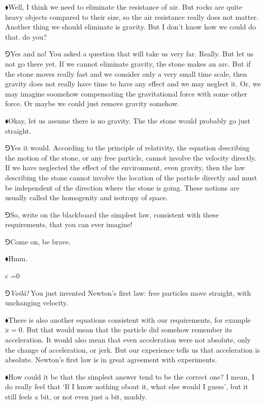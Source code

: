 \documentclass[10pt,oneside%
]{memoir}
\newenvironment{eqna}{\begin{IEEEeqnarray*}{c}}{\end{IEEEeqnarray*}\ignorespacesafterend}
\newcommand{\hea}{\(\blacklozenge\)\;}
\newcommand{\heb}{\(\Game\)\;}
\begin{document}
\hea Well, I think we need to eliminate the resistance of air. But rocks are quite heavy objects compared to their size, so the air resistance really does not matter. Another thing we should eliminate is gravity. But I don't know how we could do that. do you?

\heb Yes and no! You asked a question that will take us very far. Really. But let us not go there yet. If we cannot eliminate gravity, the stone makes an arc. But if the stone moves really fast and we consider only a very small time scale, then gravity does not really have time to have any effect and we may neglect it. Or, we may imagine soomehow compensating the gravitational force with some other force. Or maybe we could just remove gravity somehow.

\hea Okay, let us assume there is no gravity. The the stone would probably go just straight.

\heb Yes it would. According to the principle of relativity, the equation describing the motion of the stone, or any free particle, cannot involve the velocity directly. If we have neglected the effect of the environment, even gravity, then the law describing the stone cannot involve the location of the particle directly and must be independent of the direction where the stone is going. These notions are usually called the homogenity and isotropy of space.

\heb So, write on the blackboard the simplest law, consistent with these requirements, that you can ever imagine!

\heb Come on, be brave.

\hea Hmm.
\begin{eqna}
    =0
\end{eqna}

\heb \emph{Voil\`a!} You just invented Newton's first law: free particles move straight, with unchanging velocity.

\hea There is also another equations consistent with our requirements, for example \(\dddot{x}=0\). But that would mean that the particle did somehow remember its acceleration. It would also mean that even acceleration were not absolute, only the change of acceleration, or jerk. But our experience tells us that acceleration is absolute. Newton's first law is in great agreement with experiments.

\hea How could it be that the simplest answer tend to be the correct one? I mean, I do really feel that `If I know nothing obout it, what else would I guess', but it still feels a bit, or not even just a bit, muddy.
\end{document}
